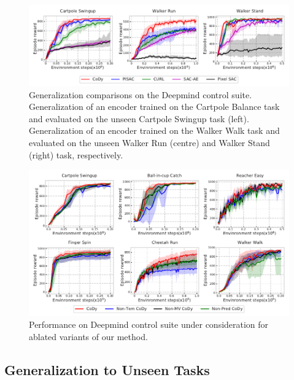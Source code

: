 \documentclass[a4paper,12pt]{article}
\begin{document}
\begin{figure}[t]
\centering
\includegraphics[width=\textwidth]{generalization.pdf}
\caption{Generalization comparisons on the Deepmind control suite. Generalization of an encoder trained on the Cartpole Balance task and evaluated on the unseen Cartpole Swingup task (left). Generalization of an encoder trained on the Walker Walk task and evaluated on the unseen Walker Run (centre) and Walker Stand (right) task, respectively.}
\label{fig:Generalization}
\end{figure}

\begin{figure}[t]
\centering
\includegraphics[width=\textwidth]{ablation_2021-10-27.pdf}
\caption{Performance on Deepmind control suite under consideration for ablated variants of our method.}
\label{fig:ablation}
\end{figure}

\subsection{Generalization to Unseen Tasks}
\end{document}
